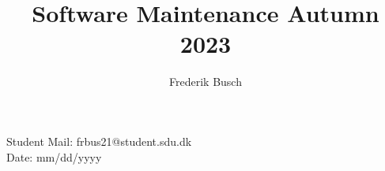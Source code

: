 \documentclass{article}
\title{%
    \bf{Software Maintenance Autumn 2023} \\
    
}
\author{Frederik Busch}
\begin{document}
\maketitle
\vspace{\fill}
\begin{center}
    \bf{%

        Student Mail: frbus21@student.sdu.dk\\

        Date: mm/dd/yyyy}
\end{center}
\newpage
\setcounter{tocdepth}{2}
\tableofcontents
\newpage












\end{document}
